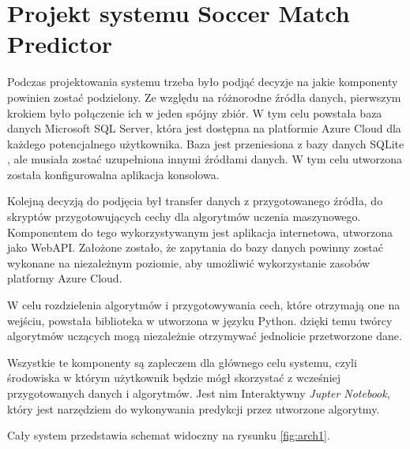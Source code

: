 \chapter{Projekt systemu Soccer Match Predictor}

\noindent Podczas projektowania systemu trzeba było podjąć decyzje na jakie komponenty powinien zostać podzielony. Ze względu na różnorodne źródła danych, pierwszym krokiem było połączenie ich w jeden spójny zbiór. W tym celu powstała baza danych Microsoft SQL Server, która jest dostępna na platformie Azure Cloud dla każdego potencjalnego użytkownika. Baza jest przeniesiona z bazy danych SQLite \cite{kagggle_european_soccer_database}, ale musiała zostać uzupełniona innymi źródłami danych. W tym celu utworzona została konfigurowalna aplikacja konsolowa.

Kolejną decyzją do podjęcia był transfer danych z przygotowanego źródła, do skryptów przygotowujących cechy dla algorytmów uczenia maszynowego. Komponentem do tego wykorzystywanym jest aplikacja internetowa, utworzona jako WebAPI. Założone zostało, że zapytania do bazy danych powinny zostać wykonane na niezależnym poziomie, aby umożliwić wykorzystanie zasobów platformy Azure Cloud.

W celu rozdzielenia algorytmów i przygotowywania cech, które otrzymają one na wejściu, powstała biblioteka w utworzona w języku Python. dzięki temu twórcy algorytmów uczących mogą niezależnie otrzymywać jednolicie przetworzone dane.

Wszystkie te komponenty są zapleczem dla głównego celu systemu, czyli środowiska w którym użytkownik będzie mógł skorzystać z wcześniej przygotowanych danych i algorytmów. Jest nim Interaktywny \textit{Jupter Notebook}, który jest narzędziem do wykonywania predykcji przez utworzone algorytmy.

Cały system przedstawia schemat widoczny na rysunku \ref{fig:arch1}.
\newpage

